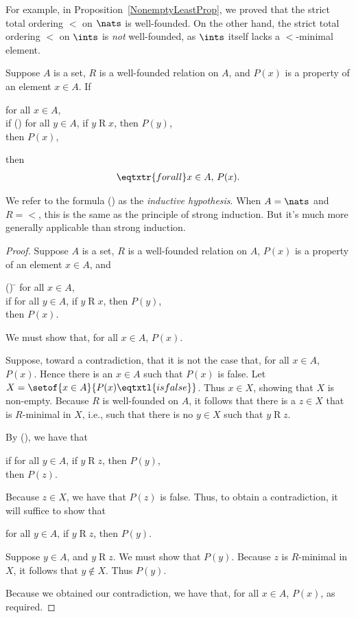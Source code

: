 For example, in Proposition~\ref{NonemptyLeastProp}, we proved that
the strict total ordering $<$ on $\nats$ is well-founded.  On the other hand,
the strict total ordering $<$ on $\ints$ is \emph{not} well-founded, as $\ints$
itself lacks a $<$-minimal element.

%
%
\begin{theorem}
Suppose $A$ is a set, $R$ is a well-founded relation on $A$, and
$P(x)$ is a property of an element $x\in A$.
If
\begin{ctabbing}
for all $x\in A$, \\
if {\rm(\dag)} for all $y\in A$, if $y\mathrel{R}x$, then $P(y)$, \\
then $P(x)$,
\end{ctabbing}
then
\begin{gather*}
\eqtxtr{for all}x\in A,\,P(x) .
\end{gather*}
\end{theorem}

We refer to the formula (\dag) as the \emph{inductive hypothesis}.
%
%
When $A=\nats$ and $R={<}$, this is the same as the principle
of strong induction.  But it's much more generally applicable than
strong induction.

\begin{proof}
Suppose $A$ is a set, $R$ is a well-founded relation on $A$,
$P(x)$ is a property of an element $x\in A$, and
\begin{ctabbing}
(\ddag) \=\+ for all $x\in A$, \\
if for all $y\in A$, if $y\mathrel{R}x$, then $P(y)$, \\
then $P(x)$.
\end{ctabbing}
We must show that, for all $x\in A$, $P(x)$.

Suppose, toward a contradiction, that it is not the case
that, for all $x\in A$, $P(x)$.  Hence there is an $x\in A$ such
that $P(x)$ is false.
Let $X=\setof{x\in A}{P(x)\eqtxtl{is false}}$.  Thus
$x\in X$, showing that $X$ is non-empty.
Because $R$ is well-founded on $A$, it follows that there is a $z\in X$
that is $R$-minimal in $X$, i.e., such that there is no $y\in X$ such that
$y\mathrel{R}z$.

By (\ddag), we have that
\begin{ctabbing}
if for all $y\in A$, if $y\mathrel{R}z$, then $P(y)$, \\
then $P(z)$.
\end{ctabbing}
Because $z\in X$, we have that $P(z)$ is false.
Thus, to obtain a contradiction, it will suffice to
show that
\begin{ctabbing}
for all $y\in A$, if $y\mathrel{R}z$, then $P(y)$.
\end{ctabbing}
Suppose $y\in A$, and $y\mathrel{R}z$. We must show that $P(y)$.
Because $z$ is $R$-minimal in $X$, it follows that $y\not\in X$.
Thus $P(y)$.

Because we obtained our contradiction, we have that,
for all $x\in A$, $P(x)$, as required.
\end{proof}

